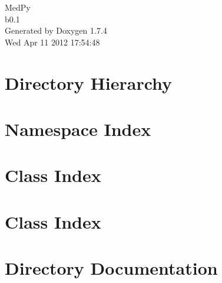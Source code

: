 \documentclass[a4paper]{book}
\begin{document}
\hypersetup{pageanchor=false}
\begin{titlepage}
\vspace*{7cm}
\begin{center}
{\Large MedPy \\[1ex]\large b0.1 }\\
\vspace*{1cm}
{\large Generated by Doxygen 1.7.4}\\
\vspace*{0.5cm}
{\small Wed Apr 11 2012 17:54:48}\\
\end{center}
\end{titlepage}
\clearemptydoublepage
{}
\tableofcontents
\clearemptydoublepage
{}
\hypersetup{pageanchor=true}
\chapter{Directory Hierarchy}

\chapter{Namespace Index}

\chapter{Class Index}

\chapter{Class Index}

\chapter{Directory Documentation}



















\end{document}
